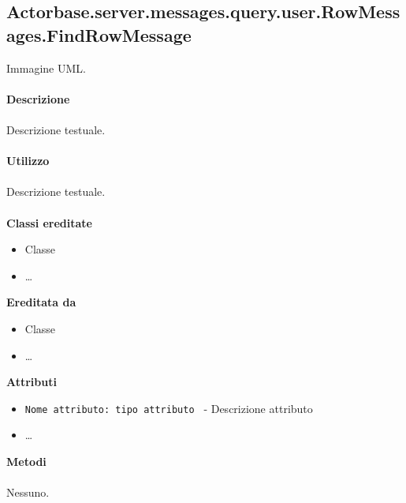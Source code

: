 \documentclass[a4paper]{article}
\begin{document}
	\subsection{Actorbase.server.messages.query.user.RowMessages.FindRowMessage}
		Immagine UML.
		\\ \\
		\textbf{Descrizione}
			\\ \\
			Descrizione testuale.
			\\ \\
		\textbf{Utilizzo}
			\\ \\
			Descrizione testuale.
			\\ \\
		\textbf{Classi ereditate}
			\begin{itemize}
				\item Classe
				\item \dots
			\end{itemize}
		\textbf{Ereditata da}
			\begin{itemize}
				\item Classe
				\item \dots
			\end{itemize}
		\textbf{Attributi}
			\begin{itemize}
				\item \texttt{Nome attributo: tipo attributo } - Descrizione attributo
				\item \dots
			\end{itemize}
		\textbf{Metodi}
			\\ \\
			Nessuno.		
			
\end{document}

